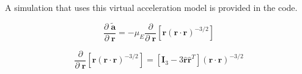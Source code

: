 \documentclass[]{article}
\newcommand{\pd}[2]{\frac{\partial\;#1}{\partial\;#2}}
\newcommand{\pddown}[2]{\frac{\partial}{\partial\;#2} \left[ #1 \right] }
\begin{document}
	A simulation that uses this virtual acceleration model is provided in the code.

	\begin{equation*}
		\pd{\tilde{\mathbf{a}}}{\mathbf{r}} = -\mu_E \pddown{ \mathbf{r} (\mathbf{r} \cdot \mathbf{r})^{-3/2} }{\mathbf{r}}
	\end{equation*}

	\begin{equation*}
		\pddown{ \mathbf{r} (\mathbf{r} \cdot \mathbf{r})^{-3/2} }{\mathbf{r}} = \left[ \mathbf{I}_3 - 3 \hat{\mathbf{r}} \hat{\mathbf{r}}^T \right] (\mathbf{r} \cdot \mathbf{r})^{-3/2}
	\end{equation*}
\end{document}
